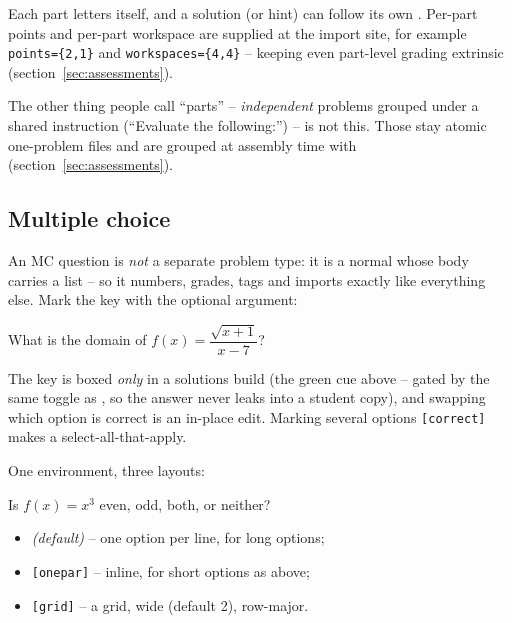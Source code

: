 Each part letters itself, and a solution (or hint) can follow its own
. Per-part points and per-part workspace are supplied at the import
site, for example \texttt{points=\{2,1\}} and \texttt{workspaces=\{4,4\}} --
keeping even part-level grading extrinsic (section~\ref{sec:assessments}).

The other thing people call ``parts'' -- \emph{independent} problems grouped
under a shared instruction (``Evaluate the following:'') -- is not this. Those
stay atomic one-problem files and are grouped at assembly time with
 (section~\ref{sec:assessments}).

\subsection{Multiple choice}

An MC question is \emph{not} a separate problem type: it is a normal
 whose body carries a  list -- so it numbers, grades,
tags and imports exactly like everything else. Mark the key with the optional
argument:

\begin{manexample}
\begin{problem}
  What is the domain of $f(x)=\dfrac{\sqrt{x+1}}{x-7}$?
  \begin{choices}
  \end{choices}
\end{problem}
\end{manexample}

The key is boxed \emph{only} in a solutions build (the green cue above -- gated
by the same toggle as , so the answer never leaks into a student
copy), and swapping which option is correct is an in-place edit. Marking
several options \texttt{[correct]} makes a select-all-that-apply.

One environment, three layouts:

\begin{manexample}
Is $f(x) = x^{3}$ even, odd, both, or neither?
\begin{choices}[onepar]
\end{choices}
\end{manexample}

\begin{itemize}
  \item \emph{(default)} -- one option per line, for long options;
  \item \texttt{[onepar]} -- inline, for short options as above;
  \item \texttt{[grid]} -- a grid,  wide (default 2),
    row-major.
\end{itemize}

